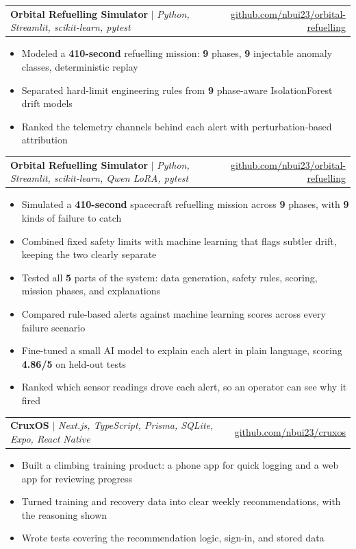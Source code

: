 \documentclass[letterpaper,10pt]{article}
\makeatletter
\newcommand{\resumeItem}[1]{
  \item\normalsize{
    {#1 \vspace{0pt}}
  }
}
\newcommand{\resumeSubheading}[3]{
    \item
    \begin{tabular*}{0.97\textwidth}[t]{l@{\extracolsep{\fill}}r}
      \textbf{#1} $|$ \textit{ #2} & #3 \\
    \end{tabular*}\vspace{-2pt}
}
\newcommand{\resumeItemListStart}{\begin{itemize}[topsep=2pt, itemsep=1pt, parsep=0pt, partopsep=0pt]}
\newcommand{\resumeItemListEnd}{\end{itemize}\vspace{0pt}}
\makeatother
\begin{document}
          \resumeSubheading{Orbital Refuelling Simulator}{Python, Streamlit, scikit-learn, pytest}{\href{https://github.com/nbui23/orbital-refuelling}{\footnotesize github.com/nbui23/orbital-refuelling}}
              \resumeItemListStart
                  \resumeItem{Modeled a \textbf{410-second} refuelling mission: \textbf{9} phases, \textbf{9} injectable anomaly classes, deterministic replay}
                  \resumeItem{Separated hard-limit engineering rules from \textbf{9} phase-aware IsolationForest drift models}
                  \resumeItem{Ranked the telemetry channels behind each alert with perturbation-based attribution}
              \resumeItemListEnd
        \else
        \resumeSubheading{Orbital Refuelling Simulator}{Python, Streamlit, scikit-learn\ifdefined\flagAIML, Qwen LoRA\fi, pytest}{\href{https://github.com/nbui23/orbital-refuelling}{\footnotesize github.com/nbui23/orbital-refuelling}}
            \resumeItemListStart
                \resumeItem{Simulated a \textbf{410-second} spacecraft refuelling mission across \textbf{9} phases, with \textbf{9} kinds of failure to catch}
                \resumeItem{Combined fixed safety limits with machine learning that flags subtler drift, keeping the two clearly separate}
                \ifdefined\flagQA
                \resumeItem{Tested all \textbf{5} parts of the system: data generation, safety rules, scoring, mission phases, and explanations}
                \else\ifdefined\flagAIML
                \resumeItem{Compared rule-based alerts against machine learning scores across every failure scenario}
                \resumeItem{Fine-tuned a small AI model to explain each alert in plain language, scoring \textbf{4.86/5} on held-out tests}
                \else
                \resumeItem{Ranked which sensor readings drove each alert, so an operator can see why it fired}
                \fi\fi
            \resumeItemListEnd

        \ifdefined\flagQA
          \resumeSubheading{CruxOS}{Next.js, TypeScript, Prisma, SQLite, Expo, React Native}{\href{https://github.com/nbui23/cruxos}{\footnotesize github.com/nbui23/cruxos}}
              \resumeItemListStart
                  \resumeItem{Built a climbing training product: a phone app for quick logging and a web app for reviewing progress}
                  \resumeItem{Turned training and recovery data into clear weekly recommendations, with the reasoning shown}
                  \resumeItem{Wrote tests covering the recommendation logic, sign-in, and stored data}
              \resumeItemListEnd
        \fi
        \fi
\end{document}
